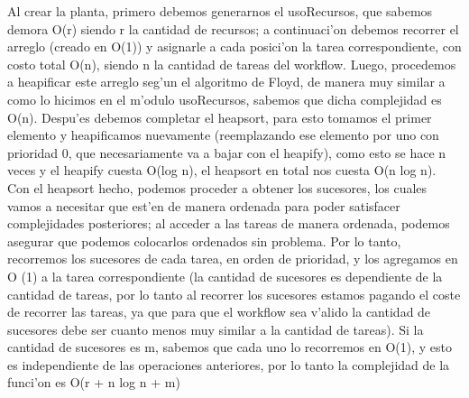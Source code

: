 \documentclass[a4paper,10pt]{article}
\begin{document}
\begin{algoritmo}
Al crear la planta, primero debemos generarnos el usoRecursos, que sabemos demora O(r) siendo r la cantidad de recursos; a continuaci'on debemos recorrer el arreglo (creado en O(1)) y asignarle a cada posici'on la tarea correspondiente, con costo total O(n), siendo n la cantidad de tareas del workflow. Luego, procedemos a heapificar este arreglo seg'un el algoritmo de Floyd, de manera muy similar a como lo hicimos en el m'odulo usoRecursos, sabemos que dicha complejidad es O(n). Despu'es debemos completar el heapsort, para esto tomamos el primer elemento y heapificamos nuevamente (reemplazando ese elemento por uno con prioridad 0, que necesariamente va a bajar con el heapify), como esto se hace n veces y el heapify cuesta O(log n), el heapsort en total nos cuesta O(n log n). Con el heapsort hecho, podemos proceder a obtener los sucesores, los cuales vamos a necesitar que est'en de manera ordenada para poder satisfacer complejidades posteriores; al acceder a las tareas de manera ordenada, podemos asegurar que podemos colocarlos ordenados sin problema. Por lo tanto, recorremos los sucesores de cada tarea, en orden de prioridad, y los agregamos en O (1) a la tarea correspondiente (la cantidad de sucesores es dependiente de la cantidad de tareas, por lo tanto al recorrer los sucesores estamos pagando el coste de recorrer las tareas, ya que para que el workflow sea v'alido la cantidad de sucesores debe ser cuanto menos muy similar a la cantidad de tareas). Si la cantidad de sucesores es m, sabemos que cada uno lo recorremos en O(1), y esto es independiente de las operaciones anteriores, por lo tanto la complejidad de la funci'on es O(r + n log n + m)

\end{algoritmo}
\end{document}
